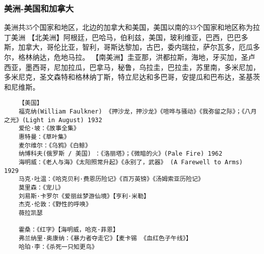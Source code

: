 \documentclass[UTF8]{../../RepresentationUniverse}
\begin{document}
\subsubsection{美洲-美国和加拿大}
美洲共35个国家和地区，北边的加拿大和美国，美国以南的33个国家和地区称为拉丁美洲
    【北美洲】阿根廷，巴哈马，伯利兹，美国，玻利维亚，巴西，巴巴多斯，加拿大，哥伦比亚，智利，哥斯达黎加，古巴，委内瑞拉，萨尔瓦多，厄瓜多尔，格林纳达，危地马拉。
    【南美洲】圭亚那，洪都拉斯，海地，牙买加，圣卢西亚，墨西哥，尼加拉瓜，巴拿马，秘鲁，乌拉圭，巴拉圭，苏里南，多米尼加，多米尼克，圣文森特和格林纳丁斯，特立尼达和多巴哥，安提瓜和巴布达，圣基茨和尼维斯。
\begin{lstlisting}
    【美国】
    福克纳(William Faulkner) 《押沙龙，押沙龙》《喧哗与骚动》《我弥留之际》；《八月之光》(Light in August) 1932
    爱伦·坡：《故事全集》
    惠特曼：《草叶集》
    麦尔维尔：《乌鸦》《白鲸》
    纳博科夫(俄罗斯 / 美国) ：《洛丽塔》；《微暗的火》(Pale Fire) 1962
    海明威：《老人与海》《太阳照常升起》《永别了，武器》 (A Farewell to Arms) 1929
    马克·吐温：《哈克贝利·费恩历险记》《百万英镑》《汤姆索亚历险记》
    莫里森：《宠儿》
    刘易斯·卡罗尔《爱丽丝梦游仙境》【亨利·米勒】
    杰克·伦敦：《野性的呼唤》
    薇拉凯瑟

    霍桑：《红字》【海明威，哈克·菲恩】
    弗兰纳里·奥康纳：《暴力者夺走它》【麦卡锡 《血红色子午线》】
    哈珀·李：《杀死一只知更鸟》


\end{lstlisting}
\end{document}

